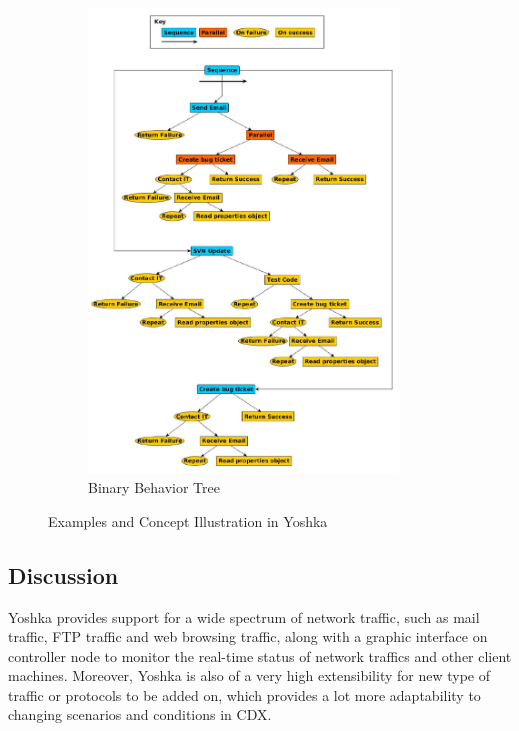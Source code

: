 \documentclass[12pt]{report}
\begin{document}
\begin{figure}[h!]
\begin{subfigure}[b]{0.45\linewidth}
	\includegraphics[width=0.9\textwidth]{./pictures/yoshka-bbt}
    \caption{Binary Behavior Tree}
  \end{subfigure}
  \caption{Examples and Concept Illustration in Yoshka}
\end{figure}

\subsection{Discussion}

Yoshka provides support for a wide spectrum of network traffic, such as mail traffic, FTP traffic and web browsing traffic, along with a graphic interface on controller node to monitor the real-time status of network traffics and other client machines. Moreover, Yoshka is also of a very high extensibility for new type of traffic or protocols to be added on, which provides a lot more adaptability to changing scenarios and conditions in CDX.\\
\end{document}
